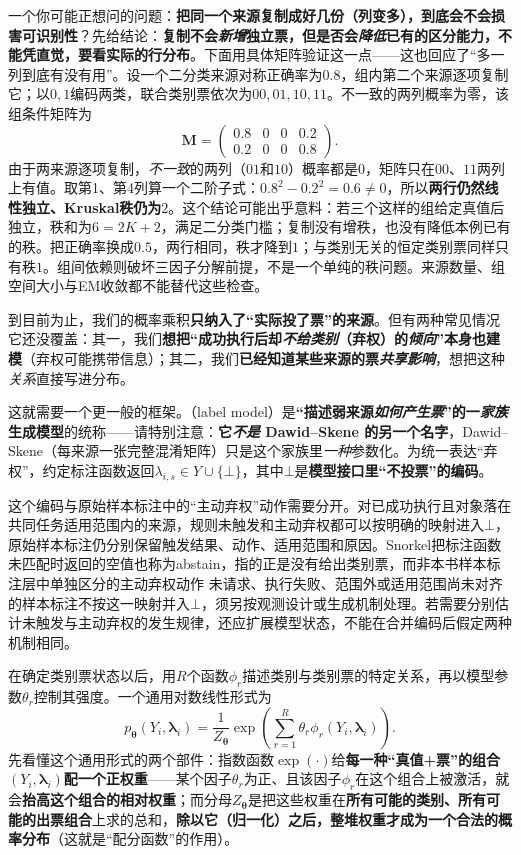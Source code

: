 一个你可能正想问的问题：\textbf{把同一个来源复制成好几份（列变多），到底会不会损害可识别性}？先给结论：\textbf{复制不会\emph{新增}独立票，但是否会\emph{降低}已有的区分能力，不能凭直觉，要看实际的行分布}。下面用具体矩阵验证这一点——这也回应了“多一列到底有没有用”。设一个二分类来源对称正确率为$0.8$，组内第二个来源逐项复制它；以$0,1$编码两类，联合类别票依次为$00,01,10,11$。不一致的两列概率为零，该组条件矩阵为
\[
  \bm{M}
  =\begin{pmatrix}
    0.8 & 0 & 0 & 0.2\\
    0.2 & 0 & 0 & 0.8
  \end{pmatrix}.
\]
由于两来源逐项复制，\emph{不一致}的两列（$01$和$10$）概率都是$0$，矩阵只在$00$、$11$两列上有值。取第1、第4列算一个二阶子式：$0.8^2-0.2^2=0.6\neq0$，所以\textbf{两行仍然线性独立、Kruskal秩仍为$2$}。这个结论可能出乎意料：若三个这样的组给定真值后独立，秩和为$6=2K+2$，满足二分类门槛；复制没有增秩，也没有降低本例已有的秩。把正确率换成$0.5$，两行相同，秩才降到$1$；与类别无关的恒定类别票同样只有秩$1$。组间依赖则破坏三因子分解前提，不是一个单纯的秩问题。来源数量、组空间大小与EM收敛都不能替代这些检查。

到目前为止，我们的概率乘积\textbf{只纳入了“实际投了票”的来源}。但有两种常见情况它还没覆盖：其一，我们\textbf{想把“成功执行后却\emph{不给类别}（弃权）的\emph{倾向}”本身也建模}（弃权可能携带信息）；其二，我们\textbf{已经知道某些来源的票\emph{共享影响}}，想把这种\emph{关系}直接写进分布。

这就需要一个更一般的框架。（label model）是\textbf{“描述弱来源\emph{如何产生票}”的一\emph{家族}生成模型}的统称——请特别注意：\textbf{它\emph{不是} Dawid--Skene 的另一个名字}，Dawid--Skene（每来源一张完整混淆矩阵）只是这个家族里\emph{一种}参数化。为统一表达“弃权”，约定标注函数返回$\lambda_{i,s}\in Y\cup\{\bot\}$，其中$\bot$是\textbf{模型接口里“不投票”的编码}。

这个编码与原始样本标注中的“主动弃权”动作需要分开。对已成功执行且对象落在共同任务适用范围内的来源，规则未触发和主动弃权都可以按明确的映射进入$\bot$，原始样本标注仍分别保留触发结果、动作、适用范围和原因。Snorkel把标注函数未匹配时返回的空值也称为abstain，指的正是没有给出类别票，而非本书样本标注层中单独区分的主动弃权动作
未请求、执行失败、范围外或适用范围尚未对齐的样本标注不按这一映射并入$\bot$，须另按观测设计或生成机制处理。若需要分别估计未触发与主动弃权的发生规律，还应扩展模型状态，不能在合并编码后假定两种机制相同。

在确定类别票状态以后，用$R$个函数$\phi_r$描述类别与类别票的特定关系，再以模型参数$\theta_r$控制其强度。一个通用对数线性形式为
\begin{equation}
  p_{\bm{\theta}}(Y_i,\bm{\lambda}_i)
  =\frac{1}{Z_{\bm{\theta}}}
  \exp\left(
    \sum_{r=1}^{R}\theta_r
    \phi_r(Y_i,\bm{\lambda}_i)
  \right).
  \label{eq:knowledge-fusion-label-model}
\end{equation}
先看懂这个通用形式的两个部件：指数函数$\exp(\cdot)$给\textbf{每一种“真值+票”的组合}$(Y_i,\bm{\lambda}_i)$\textbf{配一个正权重}——某个因子$\theta_r$为正、且该因子$\phi_r$在这个组合上被激活，就会\textbf{抬高这个组合的相对权重}；而分母$Z_{\bm{\theta}}$是把这些权重在\textbf{所有可能的类别、所有可能的出票组合}上求的总和，\textbf{除以它（归一化）之后，整堆权重才成为一个合法的概率分布}（这就是“配分函数”的作用）。

